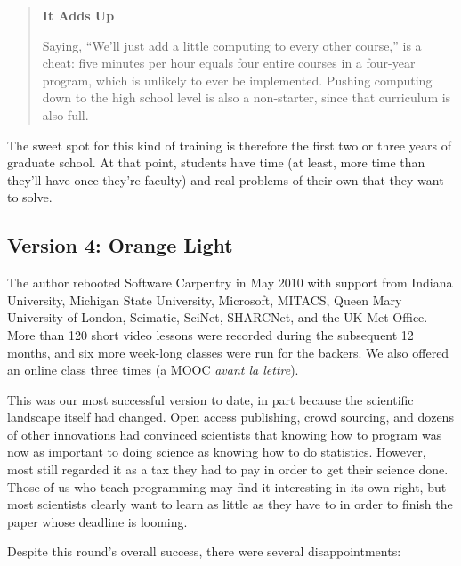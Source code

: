 \documentclass[10pt,a4paper,twocolumn]{article}
\begin{document}
\begin{quote}
\textbf{It Adds Up}

Saying, ``We'll just add a little computing to every other course,'' is
a cheat: five minutes per hour equals four entire courses in a four-year
program, which is unlikely to ever be implemented. Pushing computing
down to the high school level is also a non-starter, since that
curriculum is also full.
\end{quote}

The sweet spot for this kind of training is therefore the first two or
three years of graduate school. At that point, students have time (at
least, more time than they'll have once they're faculty) and real
problems of their own that they want to solve.

\subsection*{Version 4: Orange Light}

The author rebooted Software Carpentry in May 2010 with support from
Indiana University, Michigan State University, Microsoft, MITACS, Queen
Mary University of London, Scimatic, SciNet, SHARCNet, and the UK Met
Office. More than 120 short video lessons were recorded during the
subsequent 12 months, and six more week-long classes were run for the
backers. We also offered an online class three times (a MOOC \emph{avant
la lettre}).

This was our most successful version to date, in part because the
scientific landscape itself had changed. Open access publishing, crowd
sourcing, and dozens of other innovations had convinced scientists that
knowing how to program was now as important to doing science as knowing
how to do statistics. However, most still regarded it as a tax they had
to pay in order to get their science done. Those of us who teach
programming may find it interesting in its own right, but most
scientists clearly want to learn as little as they have to in order to
finish the paper whose deadline is looming.

Despite this round's overall success, there were several
disappointments:
\end{document}
